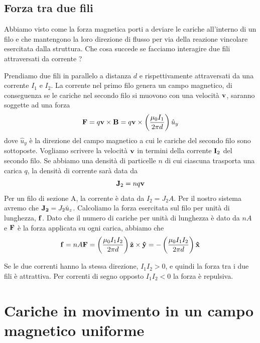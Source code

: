 \subsection{Forza tra due fili}

Abbiamo visto come la forza magnetica porti a deviare le cariche all'interno di un filo e che mantengono la loro direzione di flusso per via della reazione vincolare esercitata dalla struttura. Che cosa succede se facciamo interagire due fili attraversati da corrente ?
\newline

\noindent Prendiamo due fili in parallelo a distanza $d$ e rispettivamente attraversati da una corrente $I_1$ e $I_2$. La corrente nel primo filo genera un campo magnetico, di conseguenza se le cariche nel secondo filo si muovono con una velocit\`a $\bold{v}$, saranno soggette ad una forza 
\begin{equation*}
	\bold{F} = q \bold{v} \times \bold{B} = q \bold{v} \times \left ( \frac{\mu_0I_1}{2 \pi d}\right)\hat{u}_y
\end{equation*} 
dove $\hat{u}_y$ \`e la direzione del campo magnetico a cui le cariche del secondo filo sono sottoposte. Vogliamo scrivere la velocit\`a $\bold{v}$ in termini della corrente $\bold{I}_2$ del secondo filo. Se abbiamo una densit\`a di particelle $n$ di cui ciascuna trasporta una carica $q$, la densit\`a di corrente sar\`a data da
\begin{equation*}
	\bold{J}_2 = nq \bold{v}
\end{equation*}
Per un filo di sezione A, la corrente \`e data da $I_2 = J_2A$. Per il nostro sistema avremo che $\bold{J_2} = J_2 \hat{u}_{z}$. Calcoliamo la forza esercitata sul filo per unit\`a di lunghezza, $\bold{f}$. Dato che il numero di cariche per unit\`a di lunghezza \`e dato da $nA$ e $\bold{F}$ \`e la forza applicata su ogni carica, abbiamo che
\begin{equation}
	\bold{f} =nA\bold{F} = \left ( \frac{\mu_0 I_1 I_2}{2 \pi d}\right)\hat{\bold{z}} \times \bold{\hat{y}} = - \left ( \frac{\mu_0 I_1 I_2}{2 \pi d}\right) \bold{\hat{x}}
\end{equation}

Se le due correnti hanno la stessa direzione, $I_1 I_2 > 0$,  e quindi la forza tra i due fili \`e attrattiva. Per correnti di segno opposto $I_1 I_2 < 0$ la forza \`e repulsiva.

\section{Cariche in movimento in un campo magnetico uniforme}

